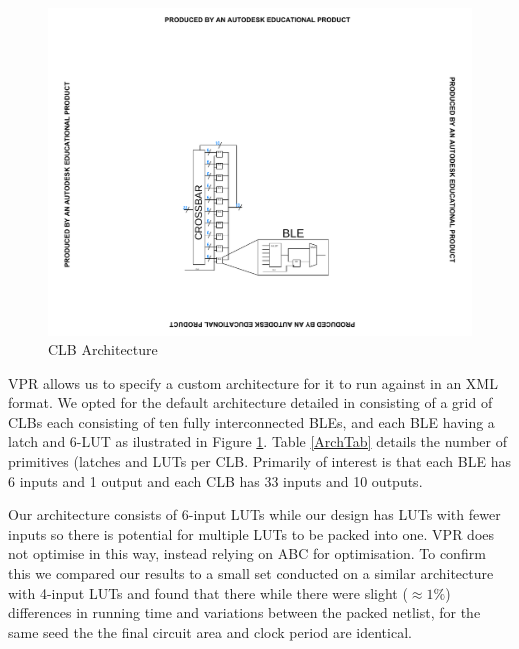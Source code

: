 \documentclass[12pt,final,oneside]{dwThesis} %
\begin{document}
   \begin{figure}

      \begin{center}

         \includegraphics[clip,trim=8cm 4cm 8cm 8cm]{images/CLB.pdf}
         \caption{\gls{CLB} Architecture} \label{ArchFig} 
      \end{center}


   \end{figure}
   \gls{VPR} allows us to specify a custom architecture for it to
   run against in an XML format. We opted for the default architecture detailed
   in \cite{VPRManual} consisting of a grid of \glspl{CLB} each consisting of
   ten fully interconnected \glspl{BLE}, and each \gls{BLE} having a latch and
   6-\gls{LUT} as ilustrated in Figure \ref{ArchFig}.  Table \ref{ArchTab}
   details the number of primitives (latches and \glspl{LUT} per \gls{CLB}.
   Primarily of interest is that each \gls{BLE} has 6 inputs and 1 output and
   each \gls{CLB} has 33 inputs and 10 outputs.
   
   Our architecture consists of 6-input \glspl{LUT} while our design has \glspl{LUT} with fewer inputs so there is potential for multiple \glspl{LUT} to be packed into one.
   \gls{VPR} does not optimise in this way, instead relying on \gls{ABC} for optimisation.
   To confirm this we compared our results to a small set conducted on a similar architecture with 4-input \glspl{LUT} and found that there while there were slight ($\approx1\%$) differences in running time and variations between the packed netlist, for the same seed the the final circuit area and clock period are identical.
\end{document}
